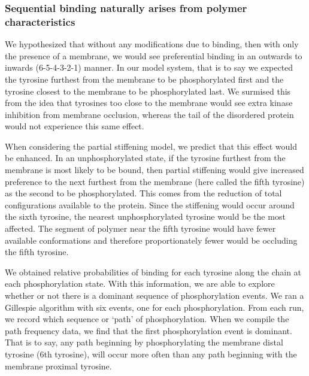 \documentclass[../../AdvancementSummary.tex]{subfiles}
\begin{document}
\subsubsection{Sequential binding naturally arises from polymer characteristics}

We hypothesized that without any modifications due to binding, then with only the presence of a membrane, we would see preferential binding in an outwards to inwards (6-5-4-3-2-1) manner. In our model system, that is to say we expected the tyrosine furthest from the membrane to be phosphorylated first and the tyrosine closest to the membrane to be phosphorylated last. We surmised this from the idea that tyrosines too close to the membrane would see extra kinase inhibition from membrane occlusion, whereas the tail of the disordered protein would not experience this same effect. 

When considering the partial stiffening model, we predict that this effect would be enhanced. In an unphosphorylated state, if the tyrosine furthest from the membrane is most likely to be bound, then partial stiffening would give increased preference to the next furthest from the membrane (here called the fifth tyrosine) as the second to be phosphorylated. This comes from the reduction of total configurations available to the protein. Since the stiffening would occur around the sixth tyrosine, the nearest unphosphorylated tyrosine would be the most affected. The segment of polymer near the fifth tyrosine would have fewer available conformations and therefore proportionately fewer would be occluding the fifth tyrosine.

We obtained relative probabilities of binding for each tyrosine along the chain at each phosphorylation state. With this information, we are able to explore whether or not there is a dominant sequence of phosphorylation events. We ran a Gillespie algorithm with six events, one for each phosphorylation. From each run, we record which sequence or `path' of phosphorylation. When we compile the path frequency data, we find that the first phosphorylation event is dominant. That is to say, any path beginning by phosphorylating the membrane distal tyrosine (6th tyrosine), will occur more often than any path beginning with the membrane proximal tyrosine. 
\end{document}
